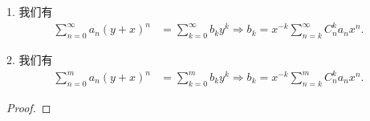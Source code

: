 \documentclass[../../main.tex]{subfiles}%
\begin{document}
\begin{proposition}[组合数的无穷和技巧]\label{proposition:组合数的无穷和技巧}
1. 我们有
\begin{align*}
\sum_{n=0}^{\infty} a_n (y + x)^n &= \sum_{k=0}^{\infty} b_k y^k \Rightarrow b_k = x^{-k} \sum_{n=k}^{\infty} C_n^k a_n x^n.
\end{align*}

2. 我们有
\begin{align*}
\sum_{n=0}^{m} a_n (y + x)^n &= \sum_{k=0}^{m} b_k y^k \Rightarrow b_k = x^{-k} \sum_{n=k}^{m} C_n^k a_n x^n.
\end{align*}
\end{proposition}
\begin{proof}



\end{proof}
\end{document}
